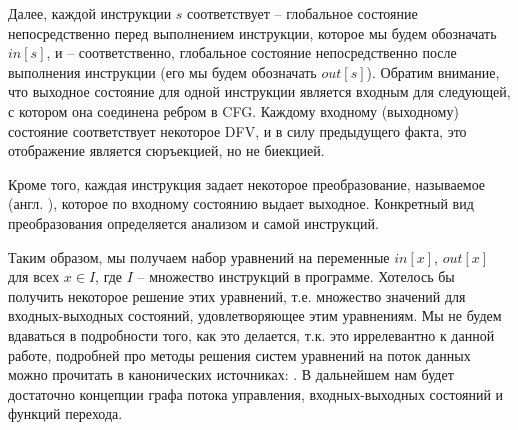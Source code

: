 Далее, каждой инструкции $s$ соответствует  -- глобальное состояние непосредственно перед выполнением инструкции, которое мы будем обозначать $in[s]$, и  -- соответственно, глобальное состояние непосредственно после выполнения инструкции (его мы будем обозначать $out[s]$). Обратим внимание, что выходное состояние для одной инструкции является входным для следующей, с котором она соединена ребром в CFG. Каждому входному (выходному) состояние соответствует некоторое DFV, и в силу предыдущего факта, это отображение является сюръекцией, но не биекцией.

Кроме того, каждая инструкция задает некоторое преобразование, называемое  (англ. ), которое по входному состоянию выдает выходное. Конкретный вид преобразования определяется анализом и самой инструкций. 

Таким образом, мы получаем набор уравнений на переменные $in[x]$, $out[x]$ для всех $x \in I$, где $I$ -- множество инструкций в программе. Хотелось бы получить некоторое решение этих уравнений, т.е. множество значений для входных-выходных состояний, удовлетворяющее этим уравнениям. Мы не будем вдаваться в подробности того, как это делается, т.к. это иррелевантно к данной работе, подробней про методы решения систем уравнений на поток данных можно прочитать в канонических источниках: \cite{dragon-book, muchnick}. В дальнейшем нам будет достаточно концепции графа потока управления, входных-выходных состояний и функций перехода.

